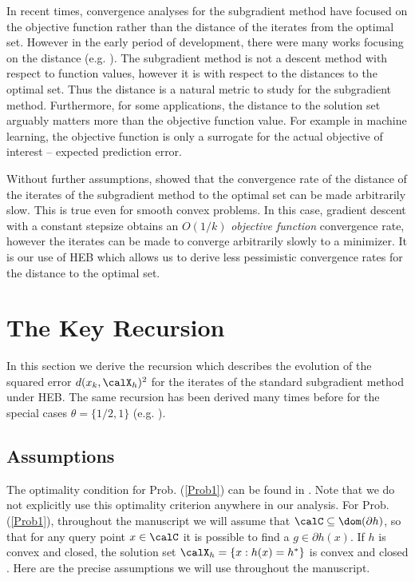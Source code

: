 \documentclass[smallextended]{svjour3}
\begin{document}
In recent times, convergence analyses for the subgradient method have focused on the objective function rather than the distance of the iterates from the optimal set. However in the early period of development, there were many works focusing on the distance (e.g. \cite{nedic2001convergence,shor2012minimization,poljak1978nonlinear,goffin1977convergence}). The subgradient method is not a descent method with respect to function values, however it is with respect to the distances to the optimal set. Thus the distance is a natural metric to study for the subgradient method.  Furthermore, for some applications, the distance to the solution set arguably matters more than the objective function value. For example in machine learning, the objective function is only a surrogate for the actual objective of interest -- expected prediction error. 

Without further assumptions, \cite[p. 167--168]{PolyakIntro} showed that the convergence rate of the distance of the iterates of the subgradient method to the optimal set can be made arbitrarily slow.
This is true even for smooth convex problems. In this case, gradient descent with a constant stepsize obtains an $O(1/k)$ \emph{objective function} convergence rate, however the iterates can be made to converge arbitrarily slowly to a minimizer. It is our use of HEB which allows us to derive less pessimistic convergence rates for the distance to the optimal set.
 

\section{The Key Recursion}\label{secKeyRec}
 In this section we derive the recursion which describes the evolution of the squared error $d(x_k,\calX_h)^2$ for the iterates of the standard subgradient method under HEB. The same recursion has been derived many times before for the special cases $\theta=\{1/2,1\}$ (e.g. \cite{goffin1977convergence,shor2012minimization,nedic2001convergence}).
\subsection{Assumptions}
\label{secMathDef}
 The optimality condition for Prob. (\ref{Prob1}) can be found in \cite[Prop. 26.5]{bauschke2011convex}. Note that we do not explicitly use this optimality criterion anywhere in our analysis.
For Prob. (\ref{Prob1}), throughout the manuscript we will assume that $\calC\subseteq\dom(\partial h)$, so that for any query point $x\in\calC$ it is possible to find a $g\in\partial h(x)$. If $h$ is convex and closed, the solution set $\calX_h=\{x:h(x)=h^*\}$ is convex and closed \cite{bauschke2011convex}.
Here are the precise assumptions we will use throughout the manuscript.
\end{document}
